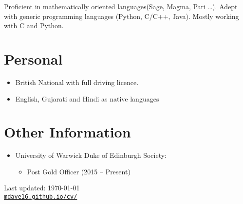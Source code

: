 \documentclass[letterpaper]{article}
\def\footerlink{mdave16.github.io/cv/}
\begin{document}
	Proficient in mathematically oriented languages(Sage, Magma, Pari \dots). Adept with generic programming languages (Python, C/C++, Java). Mostly working with C and Python.
	
	\section*{Personal}
	\begin{itemize}
		\item British National with full driving licence.
		\item English, Gujarati and Hindi as native languages
		
	\end{itemize}
	\section*{Other Information}
	\begin{itemize}
		\item University of Warwick Duke of Edinburgh Society:
		\begin{itemize}
			\item Post Gold Officer (2015 -- Present)
		\end{itemize}
		
	\end{itemize}
	\bigskip
	\begin{center}
		\begin{footnotesize}
			Last updated: \today \\
			\href{\footerlink}{\texttt{\footerlink}}
		\end{footnotesize}
	\end{center}
\end{document}

